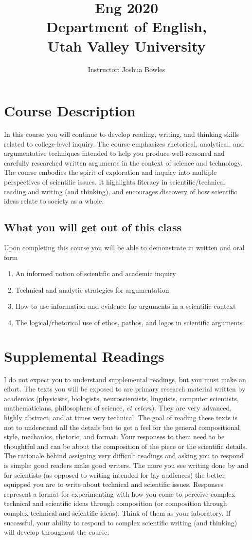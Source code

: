 \documentclass[a4paper,12pt]{article}
\title{Eng 2020\\ Department of English, \\ Utah Valley University}
\author{Instructor: Joshua Bowles}
\date{}
\begin{document}
\maketitle

\section{Course Description}
In this course you will continue to develop reading, writing, and thinking skills related to
college-level inquiry. The course emphasizes rhetorical, analytical, and argumentative
techniques intended to help you produce well-reasoned and carefully researched written
arguments in the context of science and technology. The course embodies the spirit of
exploration and inquiry into multiple perspectives of scientific issues. It highlights
literacy in scientific/technical reading and writing (and thinking), and encourages
discovery of how scientific ideas relate to society as a whole.
\subsection{What you will get out of this class}
Upon completing this course you will be able to demonstrate in written and oral form
\begin{enumerate}
    \item An informed notion of scientific and academic inquiry
\item Technical and analytic strategies for argumentation
\item How to use information and evidence for arguments in a scientific context
\item The logical/rhetorical use of ethos, pathos, and logos in scientific arguments
\end{enumerate}

\section{Supplemental Readings}
I do not expect you to understand supplemental readings, but you must make an effort.
The texts you will be exposed to are primary research material written by academics (physicists, biologists, neuroscientists, linguists, computer scientists, mathematicians, philosophers of science, {\sl et cetera}). They are very advanced, highly abstract, and at times very technical. The goal of reading these texts is not to understand all the details but to get a feel for the general compositional style, mechanics, rhetoric, and format. Your responses to them need to be thoughtful and can be about the composition of the piece or the scientific details. The rationale behind assigning very difficult readings and asking you to respond is simple: good readers make good writers. The more you see writing done by and for scientists (as opposed to writing intended for lay audiences) the better equipped you are to write about technical and scientific issues.
Responses represent a format for experimenting with how you come to perceive complex
technical and scientific ideas through composition (or composition through complex
technical and scientific ideas). Think of them as your laboratory. If successful, your
ability to respond to complex scientific writing (and thinking) will develop throughout
the course.
\end{document}
